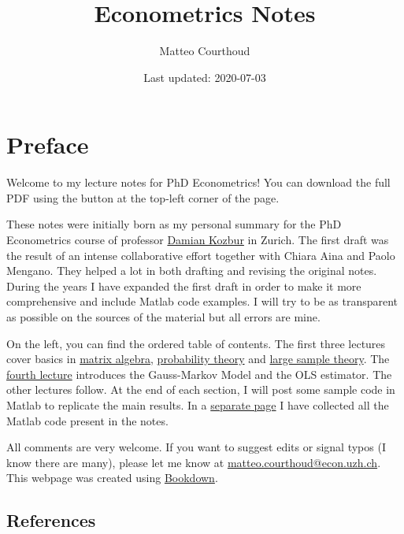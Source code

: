 \documentclass[12pt,]{book}
\title{Econometrics Notes}
\author{Matteo Courthoud}
\date{Last updated: 2020-07-03}
\begin{document}
\maketitle

\newpage

{
\hypersetup{linkcolor=black}
\setcounter{tocdepth}{2}
\tableofcontents
}
\listoftables
\listoffigures
\hypertarget{preface}{%
\chapter*{Preface}\label{preface}}


Welcome to my lecture notes for PhD Econometrics! You can download the full PDF using the button at the top-left corner of the page.

These notes were initially born as my personal summary for the PhD Econometrics course of professor \href{https://www.econ.uzh.ch/en/people/faculty/kozbur.html}{Damian Kozbur} in Zurich. The first draft was the result of an intense collaborative effort together with Chiara Aina and Paolo Mengano. They helped a lot in both drafting and revising the original notes. During the years I have expanded the first draft in order to make it more comprehensive and include Matlab code examples. I will try to be as transparent as possible on the sources of the material but all errors are mine.

On the left, you can find the ordered table of contents. The first three lectures cover basics in \protect\hyperlink{appendix1}{matrix algebra}, \protect\hyperlink{appendix2}{probability theory} and \protect\hyperlink{appendix3}{large sample theory}. The \protect\hyperlink{lecture1}{fourth lecture} introduces the Gauss-Markov Model and the OLS estimator. The other lectures follow. At the end of each section, I will post some sample code in Matlab to replicate the main results. In a \protect\hyperlink{matlabcode}{separate page} I have collected all the Matlab code present in the notes.

All comments are very welcome. If you want to suggest edits or signal typos (I know there are many), please let me know at \href{mailto:\%20matteo.courthoud@econ.uzh.ch}{matteo.courthoud@econ.uzh.ch}. This webpage was created using \href{https://bookdown.org/yihui/rmarkdown/}{Bookdown}.

\hypertarget{references}{%
\section*{References}\label{references}}
\end{document}
